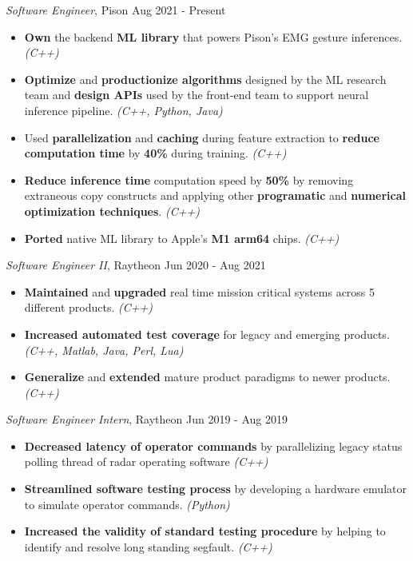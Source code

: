 \documentclass[a4paper,12pt]{memoir}
\begin{document}
\userinformation
\framebreak



\CVItem
	{\textit{Software Engineer}, Pison \hfill Aug 2021 - Present}
	{
		\begin{itemize}
			\item \textbf{Own} the backend \textbf{ML library} that powers Pison's EMG gesture inferences. \textit{(C++)}
			\item \textbf{Optimize} and \textbf{productionize algorithms} designed by the ML research team and \textbf{design APIs} used by the front-end team to support neural inference pipeline. \textit{(C++, Python, Java)}
			\item Used \textbf{parallelization} and \textbf{caching} during feature extraction to \textbf{reduce computation time} by \textbf{40\%} during training. \textit{(C++)}
			\item \textbf{Reduce inference time} computation speed by \textbf{50\%} by removing extraneous copy constructs and applying other \textbf{programatic} and \textbf{numerical optimization techniques}. \textit{(C++)}
			\item \textbf{Ported} native ML library to Apple's \textbf{M1 arm64} chips. \textit{(C++)}
		\end{itemize}
	}

\CVItem
	{\textit{Software Engineer II}, Raytheon \hfill Jun 2020 - Aug 2021}
	{
		\begin{itemize}
			\item \textbf{Maintained} and \textbf{upgraded} real time mission critical systems across 5 different products. \textit{(C++)}
			\item \textbf{Increased automated test coverage} for legacy and emerging products. \textit{(C++, Matlab, Java, Perl, Lua)}
			\item \textbf{Generalize} and \textbf{extended} mature product paradigms to newer products. \textit{(C++)}
		\end{itemize}
	}

\CVItem
	{\textit{Software Engineer Intern}, Raytheon \hfill Jun 2019 - Aug 2019}
	{
		\begin{itemize}
			\item \textbf{Decreased latency of operator commands} by parallelizing legacy status polling thread of radar operating software \textit{(C++)}
			\item \textbf{Streamlined software testing process} by developing a hardware emulator to simulate operator commands. \textit{(Python)}
			\item \textbf{Increased the validity of standard testing procedure} by helping to identify and resolve long standing segfault. \textit{(C++)}
		\end{itemize}
	}
\end{document}
